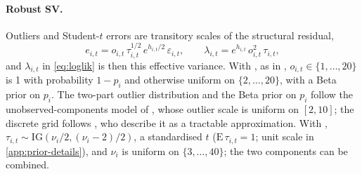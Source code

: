 \paragraph{Robust SV.} Outliers and Student-$t$ errors are transitory scales of the structural
residual,
\begin{equation}\label{eq:robust}
  e_{i,t} = o_{i,t}\,\tau_{i,t}^{1/2}\,e^{h_{i,t}/2}\,\varepsilon_{i,t}, \qquad
  \lambda_{i,t} = e^{h_{i,t}}\,o_{i,t}^2\,\tau_{i,t},
\end{equation}
and $\lambda_{i,t}$ in \eqref{eq:loglik} is then this effective variance. With ,
as in \citet{carriero2024addressing}, $o_{i,t} \in \{1, \dots, 20\}$ is 1 with probability $1 - p_i$
and otherwise uniform on $\{2, \dots, 20\}$, with a Beta prior on $p_i$. %
The two-part outlier distribution and the Beta prior on $p_i$ follow the unobserved-components
model of \citet{stock2016core}, whose outlier scale is uniform on $[2, 10]$; the discrete grid
follows \citet{carriero2024addressing}, who describe it as a tractable approximation.
With , $\tau_{i,t} \sim \mathrm{IG}(\nu_i/2, (\nu_i - 2)/2)$, a standardised $t$
($\mathrm{E}\,\tau_{i,t} = 1$; unit scale in \cref{app:prior-details}), and $\nu_i$ is uniform on
$\{3, \dots, 40\}$; the two components can be combined. %


